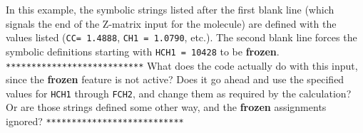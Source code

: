
In this example, the symbolic strings listed after the first blank line
(which signals the end of the Z-matrix input for the molecule) are defined
with the values listed ({\tt CC= 1.4888}, {\tt CH1 = 1.0790}, etc.).  The
second blank line forces the symbolic definitions starting with {\tt HCH1
= 10428} to be {\bf frozen}.
\verb+***************************+
What does the code actually do with this input, since the {\bf frozen}
feature is not active?  Does it go ahead and use the specified values
for {\tt HCH1} through {\tt FCH2}, and change them as required by the
calculation?  Or are those strings defined some other way, and the
{\bf frozen} assignments ignored?
\verb+***************************+
